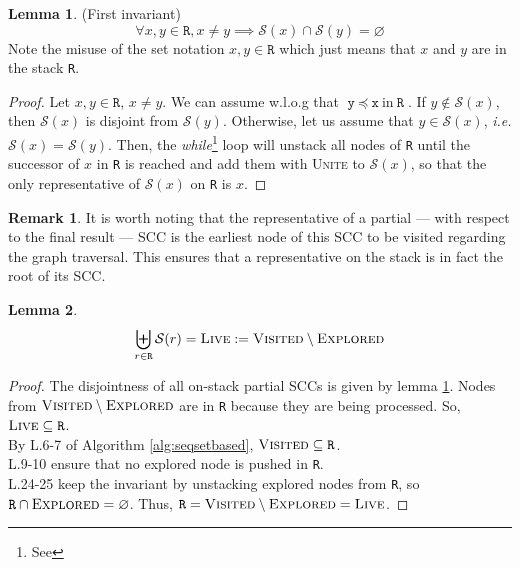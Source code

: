 \documentclass[a4 paper, 12pt]{article}
\newcommand{\stackprec}[3]{\texttt{#1}~\preceq~\texttt{#2}~\text{in}~\texttt{#3}}
\theoremstyle{definition}
\newtheorem{lemma}{Lemma}
\newtheorem{remark}{Remark}
\begin{document}
\begin{lemma}(First invariant)\label{lemma:disjointness}
    \begin{equation*}
        \forall x, y \in \texttt{R}, x\neq y \implies \mathcal{S}(x) \cap \mathcal{S}(y) = \varnothing
    \end{equation*}
    Note the misuse of the set notation $x, y \in \texttt{R}$ which just means that $x$ and $y$ are in the stack \texttt{R}.
\end{lemma}

\begin{proof}
    Let $x, y \in \texttt{R}$, $x \neq y$. We can assume w.l.o.g that $\stackprec{y}{x}{R}$.
    If $y \notin \mathcal{S}(x)$, then $\mathcal{S}(x)$ is disjoint from $\mathcal{S}(y)$.
    \BlankLine
    Otherwise, let us assume that $y \in \mathcal{S}(x)$, \textit{i.e.} $\mathcal{S}(x) = \mathcal{S}(y)$. Then, the \textit{while}\footnote{See } loop will unstack all nodes of \texttt{R} until the successor of $x$ in \texttt{R} is reached and add them with \textsc{Unite} to $\mathcal{S}(x)$, so that the only representative of $\mathcal{S}(x)$ on \texttt{R} is $x$.
\end{proof}

\begin{remark}\label{rem:rootSCC}
    It is worth noting that the representative of a partial — with respect to the final result — SCC is the earliest node of this SCC to be visited regarding the graph traversal. This ensures that a representative on the stack is in fact the root of its SCC.
\end{remark}

\begin{lemma}
    \begin{equation*}
        \biguplus_{r \in \texttt{R}} \mathcal{S}(r) = \textsc{Live} := \textsc{Visited} \setminus \textsc{Explored}
    \end{equation*}
\end{lemma}

\begin{proof}
    The disjointness of all on-stack partial SCCs is given by lemma \ref{lemma:disjointness}. Nodes from $\textsc{Visited} \setminus \textsc{Explored}$ are in \texttt{R} because they are being processed. So, $\textsc{Live} \subseteq \texttt{R}$.\\
    By L.6-7 of Algorithm \ref{alg:seqsetbased}, $\textsc{Visited} \subseteq \texttt{R}$.\\
    L.9-10 ensure that no explored node is pushed in \texttt{R}.\\
    L.24-25 keep the invariant by unstacking explored nodes from \texttt{R}, so $\texttt{R} \cap \textsc{Explored} = \varnothing$. Thus, $\texttt{R} = \textsc{Visited} \setminus \textsc{Explored} = \textsc{Live}$.
\end{proof}
\end{document}
